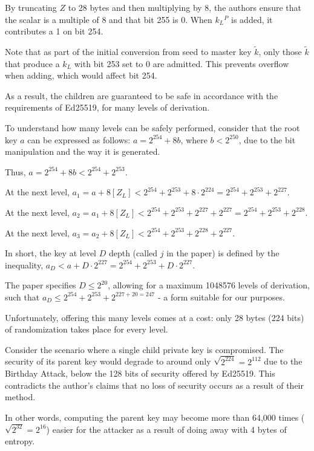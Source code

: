 \documentclass[12pt, a4paper, twocolumn]{article}
\begin{document}
By truncating $Z$ to 28 bytes and then multiplying by 8, the authors ensure that the scalar is a multiple of 8 and that bit 255 is 0. When $k{_L}^P$ is added, it contributes a 1 on bit 254.

Note that as part of the initial conversion from seed to master key $\tilde{k}$, only those $\tilde{k}$ that produce a $k_L$ with bit 253 set to 0 are admitted. This prevents overflow when adding, which would affect bit 254.

As a result, the children are guaranteed to be safe in accordance with the requirements of Ed25519, for many levels of derivation.

To understand how many levels can be safely performed, consider that the root key $a$ can be expressed as follows: $a = 2^{254} + 8b$, where $b < 2^{250}$, due to the bit manipulation and the way it is generated. 

Thus, $a = 2^{254} + 8b < 2^{254} + 2^{253}$.

At the next level, $a_{1} = a + 8[Z_L] < 2^{254} + 2^{253} + 8 \cdot 2^{224} = 2^{254} + 2^{253} + 2^{227}$.

At the next level, $a_{2} = a_{1} + 8[Z_L] < 2^{254} + 2^{253} + 2^{227} + 2^{227} = 2^{254} + 2^{253} + 2^{228}$.

At the next level, $a_{3} = a_{2} + 8[Z_L] < 2^{254} + 2^{253} + 2^{228} + 2^{227}$.

In short, the key at level $D$ depth (called $j$ in the paper) is defined by the inequality, $a_D < a + D\cdot2^{227} = 2^{254} + 2^{253} + D\cdot2^{227}$.

The paper specifies $D \leq 2^{20}$, allowing for a maximum 1048576 levels of derivation, such that $a_{D} \leq 2^{254} + 2^{253} + 2^{227 + 20 = 247}$ - a form suitable for our purposes.

Unfortunately, offering this many levels comes at a cost: only 28 bytes (224 bits) of randomization takes place for every level. 

Consider the scenario where a single child private key is compromised. The security of its parent key would degrade to around only $\sqrt{2^{224}}=2^{112}$ due to the Birthday Attack, below the 128 bits of security offered by Ed25519. This contradicts the author's claims that no loss of security occurs as a result of their method.

In other words, computing the parent key may become more than 64,000 times ($\sqrt{2^{32}}=2^{16}$) easier for the attacker as a result of doing away with 4 bytes of entropy.
\end{document}
